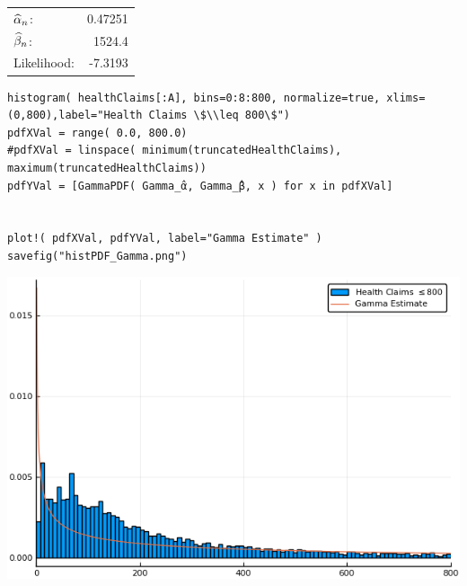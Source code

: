 \documentclass[12pt, letterpaper]{paper}
\begin{document}
\begin{center}
\begin{tabular}{lr}
\(\widehat{ \alpha }_{n}\): & 0.47251\\
\(\widehat{ \beta }_{n}\): & 1524.4\\
Likelihood: & -7.3193\\
\end{tabular}
\end{center}

\begin{verbatim}
histogram( healthClaims[:A], bins=0:8:800, normalize=true, xlims=(0,800),label="Health Claims \$\\leq 800\$")
pdfXVal = range( 0.0, 800.0)
#pdfXVal = linspace( minimum(truncatedHealthClaims), maximum(truncatedHealthClaims))
pdfYVal = [GammaPDF( Gamma_̂α, Gamma_̂β, x ) for x in pdfXVal]


plot!( pdfXVal, pdfYVal, label="Gamma Estimate" )
savefig("histPDF_Gamma.png")
\end{verbatim}

\begin{center}
\includegraphics[width=.9\linewidth]{histPDF_Gamma.png}
\end{center}
\end{document}
